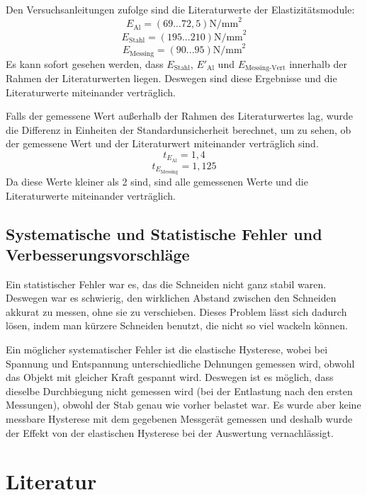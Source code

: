 \documentclass[11pt,a4paper]{article}
\begin{document}
Den Versuchsanleitungen zufolge sind die Literaturwerte der Elastizitätsmodule:
$$E_\textrm{Al} = (69 ... 72,5) \textrm{N/mm}^2$$
$$E_\textrm{Stahl} = (195 ... 210) \textrm{N/mm}^2$$
$$E_\textrm{Messing} = (90 ... 95) \textrm{N/mm}^2$$
Es kann sofort gesehen werden, dass $E_\textrm{Stahl}$, $E'_\textrm{Al}$ und $E_\textrm{Messing-Vert}$ innerhalb der Rahmen der Literaturwerten liegen. Deswegen sind diese Ergebnisse und die Literaturwerte miteinander verträglich. 

Falls der gemessene Wert außerhalb der Rahmen des Literaturwertes lag, wurde die Differenz in Einheiten der Standardunsicherheit berechnet, um zu sehen, ob der gemessene Wert und der Literaturwert miteinander verträglich sind. 
$$t_{E_\textrm{Al}} = 1,4$$
$$t_{E_\textrm{Messing}} = 1,125$$
Da diese Werte kleiner als 2 sind, sind alle gemessenen Werte und die Literaturwerte miteinander verträglich. 
\subsection{Systematische und Statistische Fehler und Verbesserungsvorschläge}
Ein statistischer Fehler war es, das die Schneiden nicht ganz stabil waren. Deswegen war es schwierig, den wirklichen Abstand zwischen den Schneiden akkurat zu messen, ohne sie zu verschieben. Dieses Problem lässt sich dadurch lösen, indem man kürzere Schneiden benutzt, die nicht so viel wackeln können. 

Ein möglicher systematischer Fehler ist die elastische Hysterese, wobei bei Spannung und Entspannung unterschiedliche Dehnungen gemessen wird, obwohl das Objekt mit gleicher Kraft gespannt wird. Deswegen ist es möglich, dass dieselbe Durchbiegung nicht gemessen wird (bei der Entlastung nach den ersten Messungen), obwohl der Stab genau wie vorher belastet war. Es wurde aber keine messbare Hysterese mit dem gegebenen Messgerät gemessen und deshalb wurde der Effekt von der elastischen Hysterese bei der Auswertung vernachlässigt. 



\section{Literatur}
	
	
	
	
	
	
	
	
\end{document}
